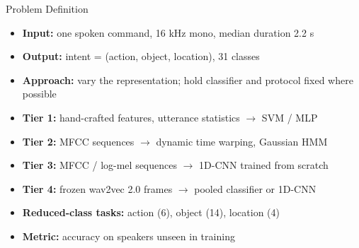 \documentclass[aspectratio=169,10pt,xcolor=table]{beamer}
\begin{document}
\begin{frame}{Problem Definition}
\begin{itemize}\setlength{\itemsep}{4pt}
\item \textbf{Input:} one spoken command, 16 kHz mono, median duration 2.2 s
\item \textbf{Output:} intent = (action, object, location), 31 classes
\item \textbf{Approach:} vary the representation; hold classifier and protocol fixed where possible
\item \textbf{Tier 1:} hand-crafted features, utterance statistics $\rightarrow$ SVM / MLP
\item \textbf{Tier 2:} MFCC sequences $\rightarrow$ dynamic time warping, Gaussian HMM
\item \textbf{Tier 3:} MFCC / log-mel sequences $\rightarrow$ 1D-CNN trained from scratch
\item \textbf{Tier 4:} frozen wav2vec 2.0 frames $\rightarrow$ pooled classifier or 1D-CNN
\item \textbf{Reduced-class tasks:} action (6), object (14), location (4)
\item \textbf{Metric:} accuracy on speakers unseen in training
\end{itemize}
\end{frame}
\end{document}
